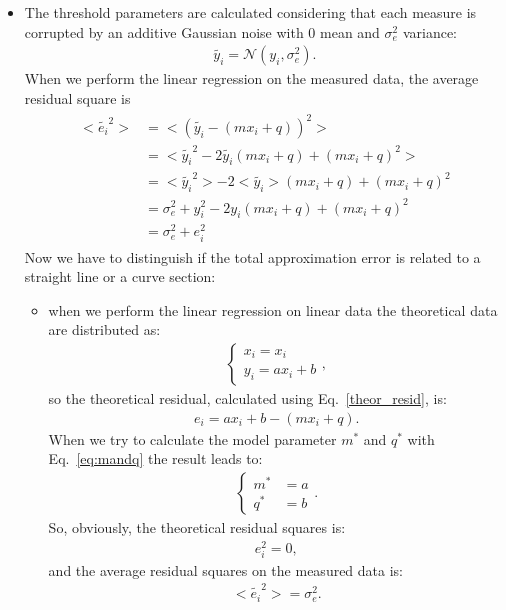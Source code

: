 \begin{itemize}
\item The threshold parameters are calculated considering that each measure is corrupted by an additive Gaussian noise with 0 mean and $\sigma_e^2$ variance: 
\begin{align}
\tilde{y_i} = \mathcal{N}(y_i,\sigma_e^2) .
\end{align}
When we perform the linear regression on the measured data, the average residual square is 
\begin{align}
\begin{split}
<\tilde{e_i}^2> &= <(\tilde{y_i} - (mx_i + q))^2>  \\[5pt]
&= <\tilde{y_i}^2 - 2\tilde{y_i}(mx_i + q) + (mx_i + q)^2>  \\[5pt]
&= <\tilde{y_i}^2> - 2<\tilde{y_i}>(mx_i + q) + (mx_i + q)^2 \\[5pt]
&=  \sigma_e^2 + y_i^2  - 2y_i(mx_i + q) + (mx_i + q)^2  \\[5pt]
&=  \sigma_e^2 + e_i^2 
\end{split}
\end{align}
Now we have to distinguish if the total approximation error is related to a straight line or a curve section:
\begin{itemize}
\item when we perform the linear regression on linear data the theoretical data are distributed as:
\begin{align}
\begin{cases}
x_i = x_i \\[5pt]
y_i = ax_i + b
\end{cases},
\end{align} 
so the theoretical residual, calculated using Eq.~\eqref{theor_resid}, is: 
\begin{align}
e_i = ax_i + b - (mx_i + q).
\end{align}
When we try to calculate the model parameter $m^*$ and $q^*$ with Eq.~\eqref{eq:mandq}  the result leads to:
 \begin{align}
\begin{cases}
m^* &= a  \\[5pt]
q^* &= b
\end{cases}.
\label{eq:mandqline}
\end{align}
So, obviously, the theoretical residual squares is:
\begin{align}
e_i^2  = 0,
\end{align} 
and the average residual squares on the measured data is:
\begin{align}
<\tilde{e_i}^2>  = \sigma_e^2.

\end{align}
\end{itemize}
\end{itemize}
